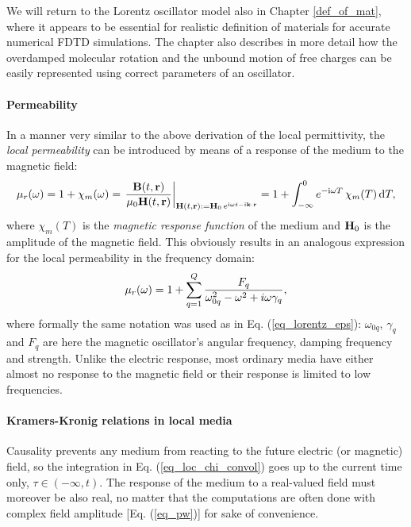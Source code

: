 We will return to the Lorentz oscillator model also in Chapter \ref{def_of_mat}, where it appears to be essential for realistic definition of materials for accurate numerical FDTD simulations. The chapter also describes in more detail how the overdamped molecular rotation and the unbound motion of free charges can be easily represented using correct parameters of an oscillator.
\paragraph{Permeability}  %
In a manner very similar to the above derivation of the local permittivity, the \textit{local permeability} can be introduced by means of a response of the medium to the magnetic field:
\begin{equation} \mu_r(\omega) = 1 + \chi_m(\omega) = \left.\frac{\mathbf{B}(t,{\mathbf{r}})}{\mu_0\mathbf{H}(t,{\mathbf{r}})} \right|_{\mathbf{H}(t, {\mathbf{r}}) := \mathbf{H}_0 \, e^{{\mathrm i}\omega t - {\mathrm i}{\mathbf{k}}\cdot{\mathbf{r}}}} = 1 + \int_{-\infty}^{0} e^{-{\mathrm i}\omega T} \,\chi_m(T) \,\mbox{d}T, \label{eq_mu_loc}\end{equation}
where $\chi_m(T)$ is the \textit{magnetic response function} of the medium and $\mathbf{H}_0$ is the amplitude of the magnetic field. This obviously results in an analogous expression for the local permeability in the frequency domain:
\begin{equation} \mu_r(\omega) = 1 + \sum_{q=1}^Q \frac{F_q}{\omega_{0q}^2 - \omega^2 + i\omega\gamma_q}, \label{eq_lorentz_mu}\end{equation} 
where formally the same notation was used as in  Eq. (\ref{eq_lorentz_eps}): $\omega_{0q}$, $\gamma_q$ and $F_q$ are here the magnetic oscillator's angular frequency, damping frequency and strength. Unlike the electric response, most ordinary media have either almost no response to the magnetic field or their response is limited to low frequencies.

\paragraph{Kramers-Kronig relations in local media}%
Causality prevents any medium from reacting to the future electric (or magnetic) field, so the integration in Eq. (\ref{eq_loc_chi_convol}) goes up to the current time only, $\tau \in (-\infty, t)$. The response of the medium to a real-valued field must moreover be also real, no matter that the computations are often done with complex field amplitude [Eq. (\ref{eq_pw})] for sake of convenience. 

